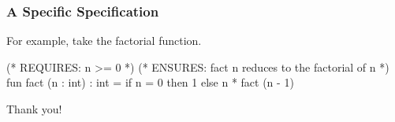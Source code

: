 \documentclass[aspectratio=169]{beamer}
\begin{document}
\begin{frame}[fragile]
  \frametitle{A Specific Specification}

  For example, take the factorial function.

  \vspace{\fill}

  \begin{codeblock}
    (* REQUIRES: n >= 0 *)
    (* ENSURES: fact n reduces to the factorial of n *)
    fun fact (n : int) : int = 
      if n = 0 then 
        1
      else 
        n * fact (n - 1) 
  \end{codeblock}
\end{frame}

\begin{frame}[plain]
	\begin{center} Thank you! \end{center}
\end{frame}
\end{document}
